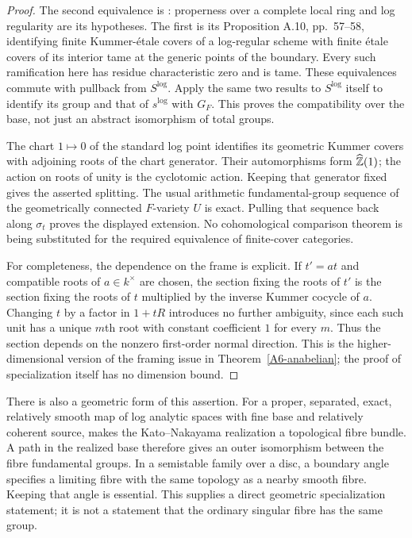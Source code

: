 \begin{proof}
The second equivalence is \cite[Corollary 3.9, pp.\ 31--32 of the July 2006 preprint]{HoshiLog2009A567}: properness over a complete local ring and log regularity are its hypotheses. The first is its Proposition A.10, pp.\ 57--58, identifying finite Kummer-étale covers of a log-regular scheme with finite étale covers of its interior tame at the generic points of the boundary. Every such ramification here has residue characteristic zero and is tame. These equivalences commute with pullback from $S^{\log}$. Apply the same two results to $S^{\log}$ itself to identify its group and that of $s^{\log}$ with $G_F$. This proves the compatibility over the base, not just an abstract isomorphism of total groups.

The chart $1\mapsto0$ of the standard log point identifies its geometric Kummer covers with adjoining roots of the chart generator. Their automorphisms form $\widehat{{\mathbb{Z}}}(1)$; the action on roots of unity is the cyclotomic action. Keeping that generator fixed gives the asserted splitting. The usual arithmetic fundamental-group sequence of the geometrically connected $F$-variety $U$ is exact. Pulling that sequence back along $\sigma_t$ proves the displayed extension. No cohomological comparison theorem is being substituted for the required equivalence of finite-cover categories.

For completeness, the dependence on the frame is explicit. If $t'=at$ and compatible roots of $a\in k^\times$ are chosen, the section fixing the roots of $t'$ is the section fixing the roots of $t$ multiplied by the inverse Kummer cocycle of $a$. Changing $t$ by a factor in $1+tR$ introduces no further ambiguity, since each such unit has a unique $m$th root with constant coefficient $1$ for every $m$. Thus the section depends on the nonzero first-order normal direction. This is the higher-dimensional version of the framing issue in Theorem~\ref{A6-anabelian}; the proof of specialization itself has no dimension bound.
\end{proof}

There is also a geometric form of this assertion. For a proper, separated, exact, relatively smooth map of log analytic spaces with fine base and relatively coherent source, \cite[Theorem 5.1, p.\ 2226]{NakayamaOgus2010A567} makes the Kato--Nakayama realization a topological fibre bundle. A path in the realized base therefore gives an outer isomorphism between the fibre fundamental groups. In a semistable family over a disc, a boundary angle specifies a limiting fibre with the same topology as a nearby smooth fibre. Keeping that angle is essential. This supplies a direct geometric specialization statement; it is not a statement that the ordinary singular fibre has the same group.

